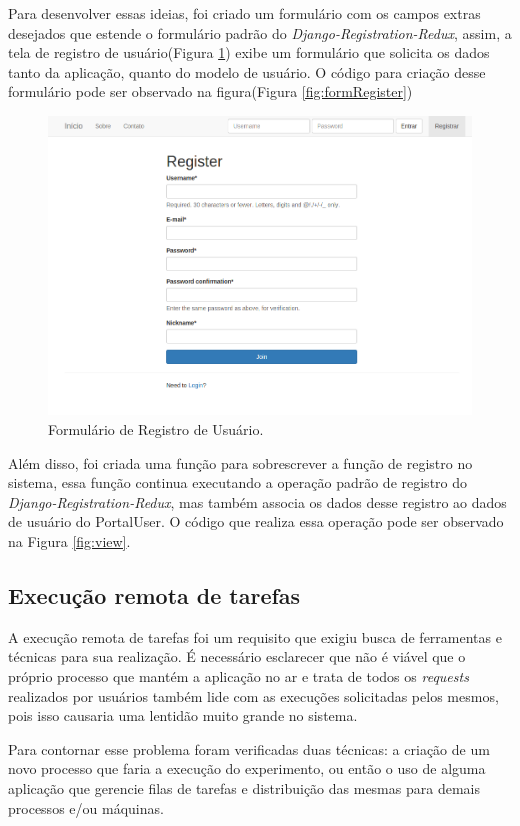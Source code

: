 \documentclass[tg]{mdtufsm}
\begin{document}
Para desenvolver essas ideias, foi criado um formulário com os campos extras desejados que estende o formulário padrão do \emph{Django-Registration-Redux}, assim, a tela de registro de usuário(Figura \ref{fig:home}) exibe um formulário que solicita os dados tanto da aplicação, quanto do modelo de usuário. O código para criação desse formulário pode ser observado na figura(Figura \ref{fig:formRegister})
\begin{figure}
	\centering
	\includegraphics[width=1\textwidth]{registro}
	\caption{
		Formulário de Registro de Usuário.
	}
	\label{fig:home}
\end{figure}
Além disso, foi criada uma função para sobrescrever a função de registro no sistema, essa função continua executando a operação padrão de registro do \emph{Django-Registration-Redux}, mas também associa os dados desse registro ao dados de usuário do PortalUser. O código que realiza essa operação pode ser observado na Figura \ref{fig:view}.


\subsection{Execução remota de tarefas}
A execução remota de tarefas foi um requisito que exigiu busca de ferramentas e técnicas para sua realização. É necessário esclarecer que não é viável que o próprio processo que mantém a aplicação no ar e trata de todos os \emph{requests} realizados por usuários também lide com as execuções solicitadas pelos mesmos, pois isso causaria uma lentidão muito grande no sistema.

Para contornar esse problema foram verificadas duas técnicas: a criação de um novo processo que faria a execução do experimento, ou então o uso de alguma aplicação que gerencie filas de tarefas e distribuição das mesmas para demais processos e/ou máquinas.
\end{document}
